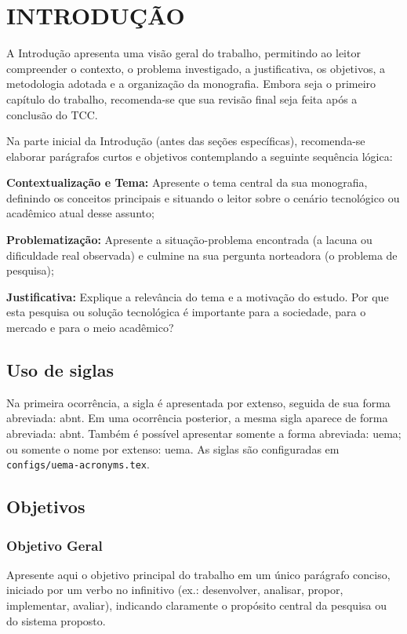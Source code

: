 \chapter{INTRODUÇÃO}
A Introdução apresenta uma visão geral do trabalho, permitindo ao leitor compreender o contexto, o problema investigado, a justificativa, os objetivos, a metodologia adotada e a organização da monografia. Embora seja o primeiro capítulo do trabalho, recomenda-se que sua revisão final seja feita após a conclusão do TCC.

Na parte inicial da Introdução (antes das seções específicas), recomenda-se elaborar parágrafos curtos e objetivos contemplando a seguinte sequência lógica:
\begin{uemaenum}
    \item \textbf{Contextualização e Tema:} Apresente o tema central da sua monografia, definindo os conceitos principais e situando o leitor sobre o cenário tecnológico ou acadêmico atual desse assunto;
    \item \textbf{Problematização:} Apresente a situação-problema encontrada (a lacuna ou dificuldade real observada) e culmine na sua pergunta norteadora (o problema de pesquisa);
    \item \textbf{Justificativa:} Explique a relevância do tema e a motivação do estudo. Por que esta pesquisa ou solução tecnológica é importante para a sociedade, para o mercado e para o meio acadêmico?
\end{uemaenum}

\section{Uso de siglas}
Na primeira ocorrência, a sigla é apresentada por extenso, seguida de sua forma abreviada: \ac{abnt}. Em uma ocorrência posterior, a mesma sigla aparece de forma abreviada: \ac{abnt}. Também é possível apresentar somente a forma abreviada: \acs{uema}; ou somente o nome por extenso: \acl{uema}. As siglas são configuradas em \texttt{configs/uema-acronyms.tex}.

\section{Objetivos}

\subsection{Objetivo Geral}
Apresente aqui o objetivo principal do trabalho em um único parágrafo conciso, iniciado por um verbo no infinitivo (ex.: desenvolver, analisar, propor, implementar, avaliar), indicando claramente o propósito central da pesquisa ou do sistema proposto.


